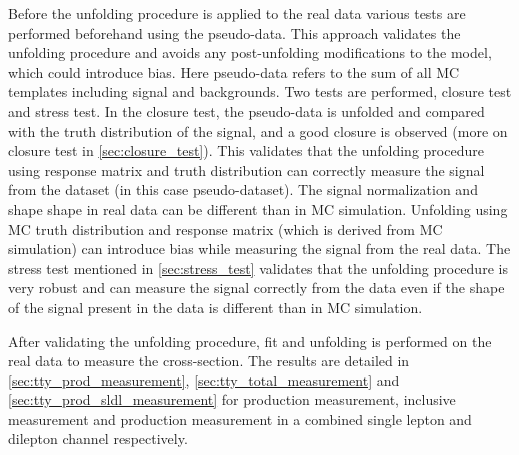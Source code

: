 Before the unfolding procedure is applied to the real data various tests are performed beforehand using the pseudo-data. This approach validates the unfolding procedure and avoids any post-unfolding modifications to the model, which could introduce bias. Here pseudo-data refers to the sum of all MC templates including signal and backgrounds. Two tests are performed, closure test and stress test. In the closure test, the pseudo-data is unfolded and compared with the truth distribution of the signal, and a good closure is observed (more on closure test in \cref{sec:closure_test}). This validates that the unfolding procedure using response matrix and truth distribution can correctly measure the signal from the dataset (in this case pseudo-dataset). The signal normalization and shape shape in real data can be different than in MC simulation. Unfolding using MC truth distribution and response matrix (which is derived from MC simulation) can introduce bias while measuring the signal from the real data. The stress test mentioned in \cref{sec:stress_test} validates that the unfolding procedure is very robust and can measure the signal correctly from the data even if the shape of the signal present in the data is different than in MC simulation. 

After validating the unfolding procedure, fit and unfolding is performed on the real data to measure the cross-section. The results are detailed in \cref{sec:tty_prod_measurement}, \cref{sec:tty_total_measurement} and \cref{sec:tty_prod_sldl_measurement} for \tty production measurement, inclusive \tty measurement and \tty production measurement in a combined single lepton and dilepton channel respectively.



